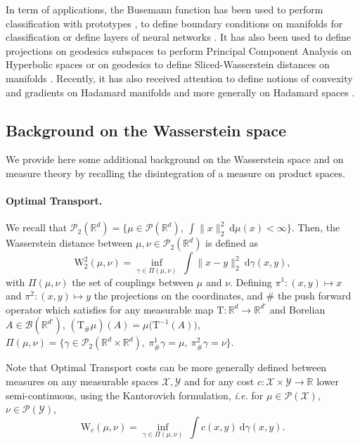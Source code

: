 \documentclass[twoside]{article}
\newcommand{\cP}{\mathcal{P}}
\newcommand{\cX}{\mathcal{X}}
\newcommand{\cY}{\mathcal{Y}}
\newcommand{\cB}{\mathcal{B}}
\newcommand{\W}{\mathrm{W}}
\newcommand{\R}{\mathbb{R}}
\newcommand{\T}{\mathrm{T}}
\begin{document}
In term of applications, the Busemann function has been used to perform classification with prototypes \citep{ghadimi2021hyperbolic, durrant2023hmsn, berg2024horospherical, berg2025multi}, to define boundary conditions on manifolds for classification \citep{fan2023horospherical, doorenbos2024hyperbolic} or define layers of neural networks \citep{wang2021laplacian, sonoda2022fully, nguyen2025neural}. It has also been used to define projections on geodesics subspaces to perform Principal Component Analysis on Hyperbolic spaces \citep{chami2021horopca} or on geodesics to define Sliced-Wasserstein distances on manifolds \citep{bonet2023hyperbolic,bonet2025sliced}. Recently, it has also received attention to define notions of convexity and gradients on Hadamard manifolds \citep{criscitiello2025horospherically} and more generally on Hadamard spaces \citep{goodwin2024subgradient}.




\subsection{Background on the Wasserstein space} \label{app:bg_wasserstein_space}

We provide here some additional background on the Wasserstein space and on measure theory by recalling the disintegration of a measure on product spaces.

\paragraph{Optimal Transport.} 

We recall that $\cP_2(\R^d)=\{\mu\in\cP(\R^d),\ \int \|x\|_2^2\ \mathrm{d}\mu(x)<\infty\}$. Then, the Wasserstein distance between $\mu,\nu\in\cP_2(\R^d)$ is defined as
\begin{equation}
    \W_2^2(\mu,\nu) = \inf_{\gamma\in\Pi(\mu,\nu)}\ \int \|x-y\|_2^2\ \mathrm{d}\gamma(x,y),
\end{equation}
with $\Pi(\mu,\nu)$ the set of couplings between $\mu$ and $\nu$. Defining $\pi^1:(x,y)\mapsto x$ and $\pi^2:(x,y)\mapsto y$ the projections on the coordinates, and $\#$ the push forward operator which satisfies for any measurable map $\T:\R^d\to \R^{d'}$ and Borelian $A\in\cB(\R^{d'})$, $(\T_\#\mu)(A) = \mu\big(\T^{-1}(A)\big)$, $\Pi(\mu,\nu)=\{\gamma\in\cP_2(\R^d\times \R^d),\ \pi^1_\#\gamma=\mu,\ \pi^2_\#\gamma=\nu\}$.

Note that Optimal Transport costs can be more generally defined between measures on any measurable spaces $\cX,\cY$ and for any cost $c:\cX\times \cY\to \R$ lower semi-continuous, using the Kantorovich formulation, \emph{i.e.} for $\mu\in\cP(\cX)$, $\nu\in\cP(\cY)$,
\begin{equation}
    \W_c(\mu,\nu) = \inf_{\gamma\in\Pi(\mu,\nu)}\ \int c(x,y)\ \mathrm{d}\gamma(x,y).
\end{equation}
\end{document}
